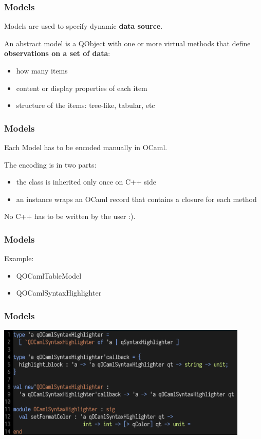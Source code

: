 \documentclass[serif,mathserif]{beamer}
\begin{document}
\begin{frame}
  \frametitle{Models}

  Models are used to specify dynamic {\bf data source}.

  \medskip

  An abstract model is a QObject with one or more virtual methods that define
  {\bf observations on a set of data}:

  \begin{itemize}
    \item how many items
    \item content or display properties of each item
    \item structure of the items: tree-like, tabular, etc
  \end{itemize}

\end{frame}

\begin{frame}
  \frametitle{Models}

  Each Model has to be encoded manually in OCaml.

  The encoding is in two parts:

  \begin{itemize}
    \item the class is inherited only once on C++ side
    \item an instance wraps an OCaml record that contains a closure for each method
  \end{itemize}

  No C++ has to be written by the user :).

\end{frame}


\begin{frame}
  \frametitle{Models}

  Example: 
  \begin{itemize}
    \item QOCamlTableModel
    \item QOCamlSyntaxHighlighter
  \end{itemize}

\end{frame}

\begin{frame}
  \frametitle{Models}

  \includegraphics[width=0.9\textwidth]{model}
\end{frame}
\end{document}
